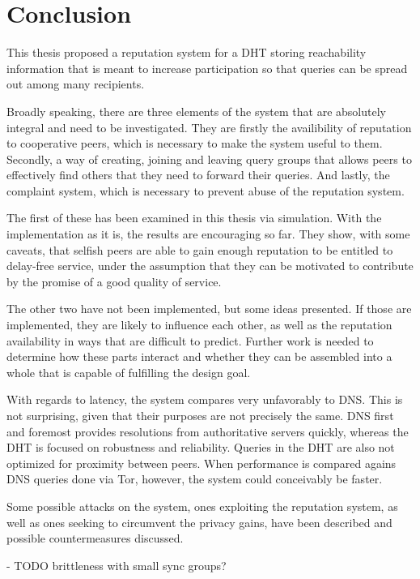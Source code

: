 \chapter{Conclusion}
\label{chap:conclusion}
This thesis proposed a reputation system for a DHT storing reachability
information that is meant to increase participation so that queries can be
spread out among many recipients.

Broadly speaking, there are three elements of the system that are absolutely
integral and need to be investigated. They are firstly the availibility of
reputation to cooperative peers, which is necessary to make the system useful to
them. Secondly, a way of creating, joining and leaving query groups that allows
peers to effectively find others that they need to forward their queries. And
lastly, the complaint system, which is necessary to prevent abuse of the
reputation system.

The first of these has been examined in this thesis via simulation. With the
implementation as it is, the results are encouraging so far. They show, with
some caveats, that selfish peers are able to gain enough reputation to be
entitled to delay-free service, under the assumption that they can be motivated
to contribute by the promise of a good quality of service.

The other two have not been implemented, but some ideas presented. If those are
implemented, they are likely to influence each other, as well as the reputation
availability in ways that are difficult to predict. Further work is needed to
determine how these parts interact and whether they can be assembled into a
whole that is capable of fulfilling the design goal.

With regards to latency, the system compares very unfavorably to DNS. This is
not surprising, given that their purposes are not precisely the same. DNS first
and foremost provides resolutions from authoritative servers quickly, whereas
the DHT is focused on robustness and reliability. Queries in the DHT are also
not optimized for proximity between peers. When performance is compared agains
DNS queries done via Tor, however, the system could conceivably be faster.

Some possible attacks on the system, ones exploiting the reputation system, as
well as ones seeking to circumvent the privacy gains, have been described and
possible countermeasures discussed.

- TODO brittleness with small sync groups?
